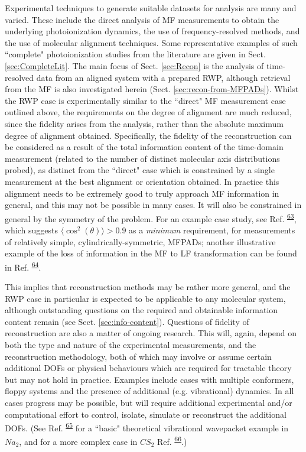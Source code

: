 \documentclass[10pt]{article}
\begin{document}
Experimental techniques to generate suitable datasets for analysis are many and varied. These include the direct analysis of MF measurements to obtain the underlying photoionization dynamics, the use of frequency-resolved methods, and the use of molecular alignment techniques. Some representative examples of such ``complete" photoionization studies from the literature are given in Sect. \ref{sec:CompleteLit}. %
The main focus of Sect. \ref{sec:Recon} is the analysis of time-resolved data from an aligned system with a prepared RWP, although retrieval from the MF is also investigated herein (Sect. \ref{sec:recon-from-MFPADs}). Whilst the RWP case is experimentally similar to the ``direct" MF measurement case outlined above, the requirements on the degree of alignment are much reduced, since the fidelity arises from the analysis, rather than the absolute maximum degree of alignment obtained. Specifically, the fidelity of the reconstruction can be considered as a result of the total information content of the time-domain measurement (related to the number of distinct molecular axis distributions probed), as distinct from the ``direct" case which is constrained by a single measurement at the best alignment or orientation obtained. In practice this alignment needs to be extremely good to truly approach MF information in general, and this may not be possible in many cases. It will also be constrained in general by the symmetry of the problem. For an example case study, see Ref. \textsuperscript{\hyperref[csl:63]{63}}, which suggests $\langle\cos^2(\theta)\rangle>0.9$ as a \textit{minimum} requirement, for measurements of relatively simple, cylindrically-symmetric, MFPADs; another illustrative example of the loss of information in the MF to LF transformation can be found in Ref. \textsuperscript{\hyperref[csl:64]{64}}.

This implies that reconstruction methods may be rather more general, and the RWP case in particular is expected to be applicable to any molecular system, although outstanding questions on the required and obtainable information content remain (see Sect. \ref{sec:info-content}). Questions of fidelity of reconstruction are also a matter of ongoing research. This will, again, depend on both the type and nature of the experimental measurements, and the reconstruction methodology, both of which may involve or assume certain additional DOFs or physical behaviours which are required for tractable theory but may not hold in practice. Examples include cases with multiple conformers, floppy systems and the presence of additional (e.g. vibrational) dynamics. In all cases progress may be possible, but will require additional experimental and/or computational effort to control, isolate, simulate or reconstruct the additional DOFs. (See Ref. \textsuperscript{\hyperref[csl:65]{65}} for a ``basic" theoretical vibrational wavepacket example in $Na_2$, and for a more complex case in $CS_2$ Ref. \textsuperscript{\hyperref[csl:66]{66}}.)
\end{document}
